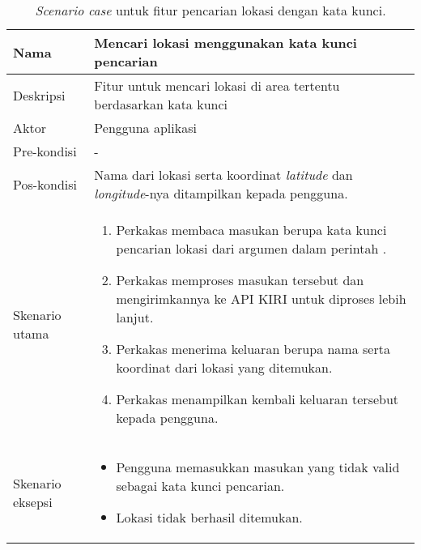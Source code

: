 \begin{table}[H]
    \centering
    \begin{tabular}{|p{3cm}|p{10cm}|}
    \hline
        Nama & Mencari lokasi menggunakan kata kunci pencarian\\
    \hline
    \hline
        Deskripsi & Fitur untuk mencari lokasi di area tertentu berdasarkan kata kunci\\
    \hline
		Aktor & Pengguna aplikasi\\
	\hline
		Pre-kondisi & -\\
    \hline
		Pos-kondisi & Nama dari lokasi serta koordinat \textit{latitude} dan \textit{longitude}-nya ditampilkan kepada pengguna.\\
    \hline
		Skenario utama & 
		\begin{enumerate}
			\item Perkakas membaca masukan berupa kata kunci pencarian lokasi dari argumen dalam perintah \cl.
			\item Perkakas memproses masukan tersebut dan mengirimkannya ke API KIRI untuk diproses lebih lanjut.
			\item Perkakas menerima keluaran berupa nama serta koordinat \latlon dari lokasi yang ditemukan.
			\item Perkakas menampilkan kembali keluaran tersebut kepada pengguna.
        \end{enumerate}\\
    \hline
		Skenario eksepsi & 
		\begin{itemize}
			\item Pengguna memasukkan masukan yang tidak valid sebagai kata kunci pencarian.
			\item Lokasi tidak berhasil ditemukan.
        \end{itemize}\\
	\hline
    \end{tabular}
    \caption{\textit{Scenario case} untuk fitur pencarian lokasi dengan kata kunci.}
    \label{tab:thesisapp-scenariocase-searchplace}
\end{table}

